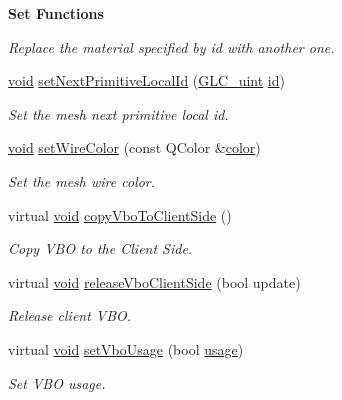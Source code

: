 \begin{Indent}{\bf Set Functions}
\begin{DoxyCompactItemize}
\begin{DoxyCompactList}\small\item\em Replace the material specified by id with another one. \end{DoxyCompactList}\item 
\hyperlink{group___u_a_v_objects_plugin_ga444cf2ff3f0ecbe028adce838d373f5c}{void} \hyperlink{class_g_l_c___mesh_a8a1f13278ada63606cb81ef2b077e3de}{set\-Next\-Primitive\-Local\-Id} (\hyperlink{glc__global_8h_abf950976fabed69026558df8e2da6c6b}{G\-L\-C\-\_\-uint} \hyperlink{glext_8h_a58c2a664503e14ffb8f21012aabff3e9}{id})
\begin{DoxyCompactList}\small\item\em Set the mesh next primitive local id. \end{DoxyCompactList}\item 
\hyperlink{group___u_a_v_objects_plugin_ga444cf2ff3f0ecbe028adce838d373f5c}{void} \hyperlink{class_g_l_c___mesh_a46aa8ec2f6a1bc09ec7081d2c2474bde}{set\-Wire\-Color} (const Q\-Color \&\hyperlink{glext_8h_a3ea846f998d64f079b86052b6c4193a8}{color})
\begin{DoxyCompactList}\small\item\em Set the mesh wire color. \end{DoxyCompactList}\item 
virtual \hyperlink{group___u_a_v_objects_plugin_ga444cf2ff3f0ecbe028adce838d373f5c}{void} \hyperlink{class_g_l_c___mesh_afb03c651f253baf7e516ff7ca317fbfc}{copy\-Vbo\-To\-Client\-Side} ()
\begin{DoxyCompactList}\small\item\em Copy V\-B\-O to the Client Side. \end{DoxyCompactList}\item 
virtual \hyperlink{group___u_a_v_objects_plugin_ga444cf2ff3f0ecbe028adce838d373f5c}{void} \hyperlink{class_g_l_c___mesh_a70c25ffa800571eb785c38f01092bb17}{release\-Vbo\-Client\-Side} (bool update)
\begin{DoxyCompactList}\small\item\em Release client V\-B\-O. \end{DoxyCompactList}\item 
virtual \hyperlink{group___u_a_v_objects_plugin_ga444cf2ff3f0ecbe028adce838d373f5c}{void} \hyperlink{class_g_l_c___mesh_a65527c0db45957abc0d636d23066e327}{set\-Vbo\-Usage} (bool \hyperlink{glext_8h_ae759ed0394ed5353d8bef2fb755305da}{usage})
\begin{DoxyCompactList}\small\item\em Set V\-B\-O usage. \end{DoxyCompactList}\end{DoxyCompactItemize}
\end{Indent}
